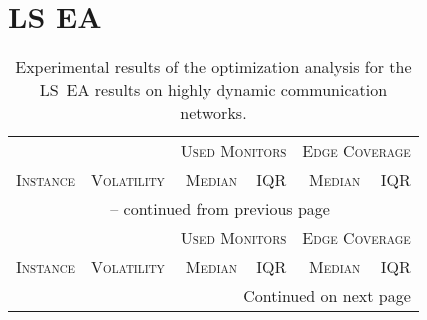\documentclass{scrartcl}
\begin{document}
\section{LS EA}
\begin{center}
\begin{longtable}{lrrrrr}
    \caption{Experimental results of the optimization analysis for the LS~EA results on highly dynamic communication networks.}\\
    \toprule
    & \textsc{} & \multicolumn{2}{c}{\textsc{Used Monitors}} & \multicolumn{2}{c}{\textsc{Edge Coverage}} \\
        \textsc{Instance} & \textsc{Volatility} & \textsc{Median} & \textsc{IQR} & \textsc{Median} & \textsc{IQR}\\
    \midrule
    \endfirsthead
    
    \multicolumn{6}{c}{\tablename~\thetable{} -- continued from previous page}\\
    & \textsc{} & \multicolumn{2}{c}{\textsc{Used Monitors}} & \multicolumn{2}{c}{\textsc{Edge Coverage}} \\
        \textsc{Instance} & \textsc{Volatility} & \textsc{Median} & \textsc{IQR} & \textsc{Median} & \textsc{IQR}\\
    \midrule
    \endhead
    
    \midrule
    \multicolumn{6}{r}{Continued on next page}
    \endfoot
    \bottomrule
    \endlastfoot
    

\end{longtable}
\end{center}
\end{document}
